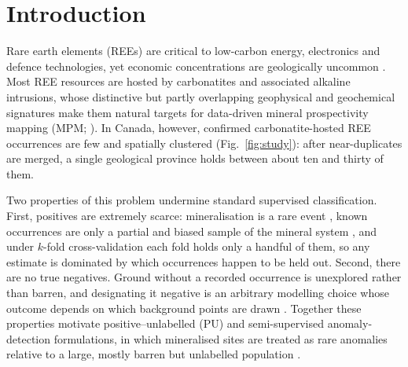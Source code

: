 \documentclass[pdflatex,sn-apa]{sn-jnl}
\begin{document}
\maketitle

\section{Introduction}\label{sec:intro}

Rare earth elements (REEs) are critical to low-carbon energy, electronics and defence technologies, yet economic concentrations are geologically uncommon \citep{Wang2020}. Most REE resources are hosted by carbonatites and associated alkaline intrusions, whose distinctive but partly overlapping geophysical and geochemical signatures make them natural targets for data-driven mineral prospectivity mapping (MPM; \citealp{Verplanck2014,Simandl2018}). In Canada, however, confirmed carbonatite-hosted REE occurrences are few and spatially clustered (Fig.~\ref{fig:study}): after near-duplicates are merged, a single geological province holds between about ten and thirty of them.

Two properties of this problem undermine standard supervised classification. First, positives are extremely scarce: mineralisation is a rare event \citep{Xiong2018}, known occurrences are only a partial and biased sample of the mineral system \citep{Coolbaugh2007,Parsa2021,Zuo2021}, and under $k$-fold cross-validation each fold holds only a handful of them, so any estimate is dominated by which occurrences happen to be held out. Second, there are no true negatives. Ground without a recorded occurrence is unexplored rather than barren, and designating it negative is an arbitrary modelling choice whose outcome depends on which background points are drawn \citep{Zuo2020}. Together these properties motivate positive--unlabelled (PU) and semi-supervised anomaly-detection formulations, in which mineralised sites are treated as rare anomalies relative to a large, mostly barren but unlabelled population \citep{Chen2019,Xiong2016,Xiong2021,Bekker2020,Luo2026}.
\end{document}
